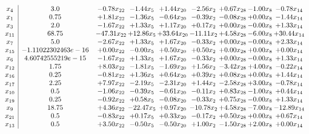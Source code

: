 \documentclass[8pt]{article}
\begin{document}
\[\begin{array}{c| c c@{\hskip 2pt} c@{\hskip 2pt} c@{\hskip 2pt} c@{\hskip 2pt} c@{\hskip 2pt} c@{\hskip 2pt} c@{\hskip 2pt} }
 x_{4}   &  3.0 & -0.78 x_{22} & -1.44 x_{5} & +  1.44 x_{20} & -2.56 x_{2} & +  0.67 x_{28} & -1.00 x_{8} & -0.78 x_{14}\\
 x_{1}   &  0.75 & +  1.81 x_{22} & -1.36 x_{5} & -0.64 x_{20} & -0.39 x_{2} & -0.08 x_{28} & +  0.00 x_{8} & -1.44 x_{14}\\
 x_{3}   &  2.0 & -1.67 x_{22} & +  1.33 x_{5} & +  1.17 x_{20} & +  0.17 x_{2} & +  0.00 x_{28} & -0.00 x_{8} & +  1.33 x_{14}\\
 x_{11}   &  68.75 & -47.31 x_{22} & + 12.86 x_{5} & + 33.64 x_{20} & -11.11 x_{2} & +  4.58 x_{28} & -6.00 x_{8} & + 30.44 x_{14}\\
 x_{7}   &  5.0 & -2.67 x_{22} & +  1.33 x_{5} & +  1.67 x_{20} & -0.33 x_{2} & +  0.00 x_{28} & -0.00 x_{8} & +  2.33 x_{14}\\
 x_{15}   &  -1.11022302463e-16 & +  0.00 x_{22} & -0.00 x_{5} & +  0.50 x_{20} & +  0.50 x_{2} & +  0.00 x_{28} & +  0.00 x_{8} & +  0.00 x_{14}\\
 x_{6}   &  4.60742555219e-15 & -1.67 x_{22} & +  1.33 x_{5} & +  1.67 x_{20} & -0.33 x_{2} & +  0.00 x_{28} & -0.00 x_{8} & +  1.33 x_{14}\\
 x_{12}   &  1.75 & +  8.03 x_{22} & -1.81 x_{5} & -1.69 x_{20} & +  1.56 x_{2} & -3.42 x_{28} & +  4.00 x_{8} & -0.22 x_{14}\\
 x_{16}   &  0.25 & -0.81 x_{22} & +  1.36 x_{5} & +  0.64 x_{20} & +  0.39 x_{2} & +  0.08 x_{28} & +  0.00 x_{8} & +  1.44 x_{14}\\
 x_{17}   &  2.25 & +  7.97 x_{22} & -2.19 x_{5} & -2.31 x_{20} & +  1.44 x_{2} & -2.58 x_{28} & +  3.00 x_{8} & -0.78 x_{14}\\
 x_{10}   &  0.5 & -1.06 x_{22} & -0.39 x_{5} & -0.61 x_{20} & -0.11 x_{2} & +  0.83 x_{28} & -1.00 x_{8} & +  0.44 x_{14}\\
 x_{19}   &  0.25 & -0.92 x_{22} & +  0.58 x_{5} & -0.08 x_{20} & -0.33 x_{2} & +  0.75 x_{28} & -0.00 x_{8} & +  1.33 x_{14}\\
 x_{9}   &  18.75 & +  4.36 x_{22} & -22.47 x_{5} & +  0.97 x_{20} & -10.78 x_{2} & +  4.58 x_{28} & -7.00 x_{8} & -12.89 x_{14}\\
 x_{21}   &  0.5 & -0.83 x_{22} & +  0.17 x_{5} & +  0.33 x_{20} & -0.17 x_{2} & +  0.50 x_{28} & +  0.00 x_{8} & +  0.67 x_{14}\\
 x_{13}   &  0.5 & +  3.50 x_{22} & -0.50 x_{5} & -0.50 x_{20} & +  1.00 x_{2} & -1.50 x_{28} & +  2.00 x_{8} & +  0.00 x_{14}\\

\end{array}\]
\end{document}
